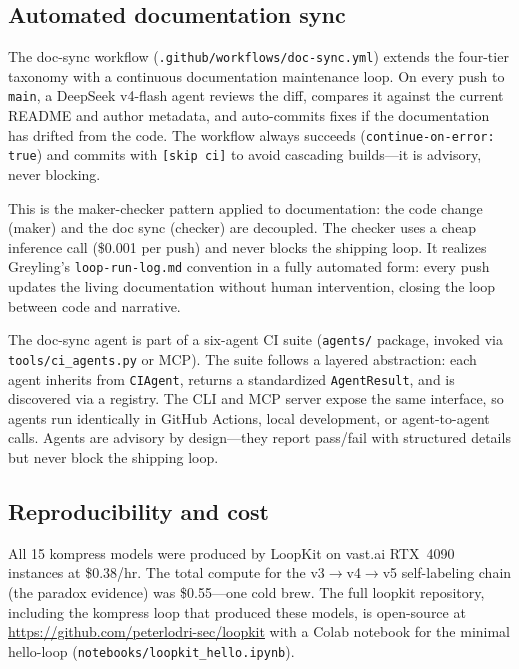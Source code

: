 \subsection{Automated documentation sync}
\label{sec:loopkit:docsync}

The doc-sync workflow (\texttt{.github/workflows/doc-sync.yml}) extends the
four-tier taxonomy with a continuous documentation maintenance loop. On every
push to \texttt{main}, a DeepSeek v4-flash agent reviews the diff, compares it
against the current README and author metadata, and auto-commits fixes if the
documentation has drifted from the code. The workflow always succeeds
(\texttt{continue-on-error: true}) and commits with \texttt{[skip ci]} to
avoid cascading builds---it is advisory, never blocking.

This is the maker-checker pattern applied to documentation: the code change
(maker) and the doc sync (checker) are decoupled. The checker uses a cheap
inference call (\$0.001 per push) and never blocks the shipping loop. It
realizes Greyling's \texttt{loop-run-log.md} convention
\citep{greyling2026loop} in a fully automated form: every push updates the
living documentation without human intervention, closing the loop between
code and narrative.

The doc-sync agent is part of a six-agent CI suite
(\texttt{agents/} package, invoked via \texttt{tools/ci\_agents.py} or MCP).
The suite follows a layered abstraction: each agent inherits from
\texttt{CIAgent}, returns a standardized \texttt{AgentResult}, and is
discovered via a registry. The CLI and MCP server expose the same interface,
so agents run identically in GitHub Actions, local development, or agent-to-agent
calls. Agents are advisory by design---they report pass/fail with structured
details but never block the shipping loop.

\subsection{Reproducibility and cost}
\label{sec:loopkit:repro}

All 15 kompress models were produced by LoopKit on vast.ai RTX~4090
instances at \$0.38/hr. The total compute for the v3$\to$v4$\to$v5
self-labeling chain (the paradox evidence) was \$0.55---one cold brew. The
full loopkit repository, including the kompress loop that produced these
models, is open-source at \url{https://github.com/peterlodri-sec/loopkit}
with a Colab notebook for the minimal hello-loop
(\texttt{notebooks/loopkit\_hello.ipynb}).

